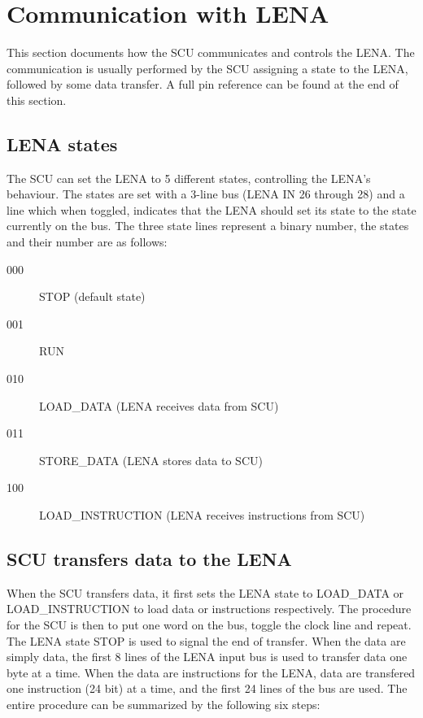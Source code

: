\section{Communication with LENA}
\label{sec:SCU-LENA-communication}

This section documents how the SCU communicates and controls the LENA. The communication is usually performed by the SCU assigning a state to the LENA, followed by some data transfer. A full pin reference can be found at the end of this section.

\subsection{LENA states}

The SCU can set the LENA to 5 different states, controlling the LENA's behaviour. The states are set with a 3-line bus (LENA IN 26 through 28) and a line which when toggled, indicates that the LENA should set its state to the state currently on the bus. The three state lines represent a binary number, the states and their number are as follows:

\begin{description}
\item[000] STOP (default state) 
\item[001] RUN
\item[010] LOAD\_DATA (LENA receives data from SCU) 
\item[011] STORE\_DATA (LENA stores data to SCU)
\item[100] LOAD\_INSTRUCTION (LENA receives instructions from SCU) 
\end{description}


\subsection{SCU transfers data to the LENA}

When the SCU transfers data, it first sets the LENA state to LOAD\_DATA or LOAD\_INSTRUCTION to load data or instructions respectively. The procedure for the SCU is then to put one word on the bus, toggle the clock line and repeat. The LENA state STOP is used to signal the end of transfer. When the data are simply data, the first 8 lines of the LENA input bus is used to transfer data one byte at a time. When the data are instructions for the LENA, data are transfered one instruction (24 bit) at a time, and the first 24 lines of the bus are used. The entire procedure can be summarized by the following six steps:

